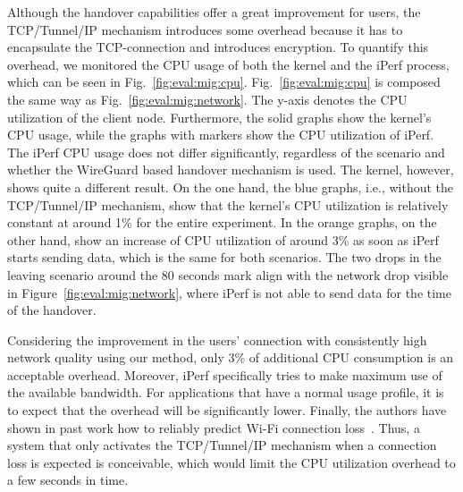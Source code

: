 Although the handover capabilities offer a great improvement for users, the TCP/Tunnel/IP mechanism introduces some overhead because it has to encapsulate the TCP-connection and introduces encryption.
To quantify this overhead, we monitored the CPU usage of both the kernel and the iPerf process, which can be seen in Fig.~\ref{fig:eval:mig:cpu}.
Fig.~\ref{fig:eval:mig:cpu} is composed the same way as Fig.~\ref{fig:eval:mig:network}.
The y-axis denotes the CPU utilization of the client node.
Furthermore, the solid graphs show the kernel's CPU usage, while the graphs with markers show the CPU utilization of iPerf.
The iPerf CPU usage does not differ significantly, regardless of the scenario and whether the WireGuard based handover mechanism is used.
The kernel, however, shows quite a different result.
On the one hand, the blue graphs, i.e., without the TCP/Tunnel/IP mechanism, show that the kernel's CPU utilization is relatively constant at around 1\% for the entire experiment.
In the orange graphs, on the other hand, show an increase of CPU utilization of around 3\% as soon as iPerf starts sending data, which is the same for both scenarios.
The two drops in the leaving scenario around the 80 seconds mark align with the network drop visible in Figure~\ref{fig:eval:mig:network}, where iPerf is not able to send data for the time of the handover.

Considering the improvement in the users' connection with consistently high network quality using our method, only 3\% of additional CPU consumption is an acceptable overhead.
Moreover, iPerf specifically tries to make maximum use of the available bandwidth.
For applications that have a normal usage profile, it is to expect that the overhead will be significantly lower.
Finally, the authors have shown in past work how to reliably predict Wi-Fi connection loss~\cite{hochst2019learning}.
Thus, a system that only activates the TCP/Tunnel/IP mechanism when a connection loss is expected is conceivable, which would limit the CPU utilization overhead to a few seconds in time.
